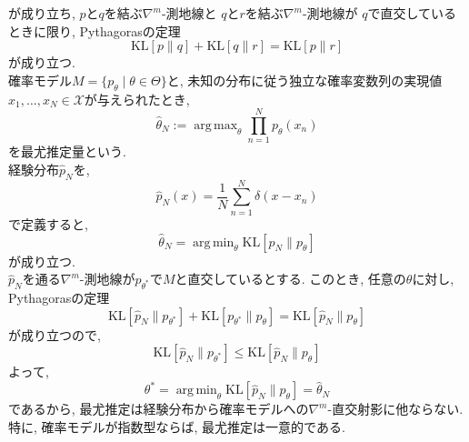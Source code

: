 \documentclass{jarticle}
\theoremstyle{definition}
\DeclareMathOperator*{\argmin}{arg\,min}
\DeclareMathOperator*{\argmax}{arg\,max}
\begin{document}
   が成り立ち, 
   $p$と$q$を結ぶ$\nabla^m$-測地線と
   $q$と$r$を結ぶ$\nabla^m$-測地線が
   $q$で直交しているときに限り, Pythagorasの定理
   \[
   		\text{KL}[p\|q]+\text{KL}[q\|r]=\text{KL}[p\|r]
   \]
   が成り立つ.\\
   確率モデル$M=\{p_\theta\mid\theta\in\Theta\}$と, 
   未知の分布に従う独立な確率変数列の実現値$x_1,\dots,x_N\in\mathcal{X}$が与えられたとき, 
   \[
   		\hat{\theta}_N:=\argmax_{\theta}\prod_{n=1}^N p_\theta(x_n)
   \]
   を最尤推定量という.\\
   経験分布$\hat{p}_N$を,
   \[
   		\hat{p}_N(x)=\frac{1}{N}\sum_{n=1}^N\delta(x-x_n)
   \]
   で定義すると, 
   \[
   		\hat{\theta}_N=\argmin_{\theta}\text{KL}[\hat{p}_N\|p_\theta]
   \]
   が成り立つ.\\
   $\hat{p}_N$を通る$\nabla^m$-測地線が$p_{\theta^*}$で$M$と直交しているとする. 
   このとき, 任意の$\theta$に対し, Pythagorasの定理
   \[
   		\text{KL}[\hat{p}_N\|p_{\theta^*}]+\text{KL}[p_{\theta^*}\|p_\theta]
        =\text{KL}[\hat{p}_N\|p_{\theta}]
   \]
   が成り立つので, 
   \[
   		\text{KL}[\hat{p}_N\|p_{\theta^*}]
        \leq \text{KL}[\hat{p}_N\|p_{\theta}]
   \]
   よって, 
   \[
   		\theta^*=\argmin_{\theta} \text{KL}[\hat{p}_N\|p_{\theta}]=\hat{\theta}_N
   \]
   であるから, 最尤推定は経験分布から確率モデルへの$\nabla^m$-直交射影に他ならない. 
   特に, 確率モデルが指数型ならば, 最尤推定は一意的である.
   
\end{document}
